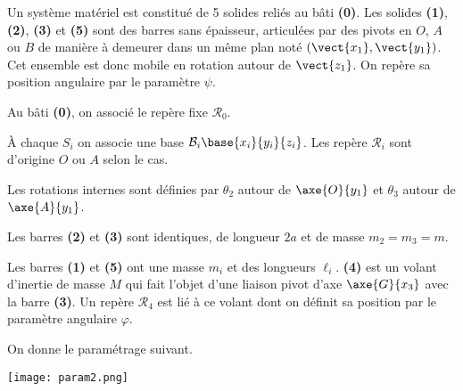 \ifprof
\else
\begin{multicols}{2}
\fi


Un système matériel est constitué de 5 solides reliés au bâti \textbf{(0)}. Les solides \textbf{(1)}, \textbf{(2)}, \textbf{(3)} et \textbf{(5)} sont des barres sans épaisseur, articulées par des pivots en $O$, $A$ ou $B$ de manière à demeurer dans un même plan noté $ \left(\vect{x_1},\vect{y_1}\right)$. Cet ensemble est donc mobile en rotation autour de $\vect{z_1}$. On repère sa position angulaire par le paramètre $\psi$. 

Au bâti \textbf{(0)}, on associé le repère fixe $\mathcal{R}_0$. 

À chaque $S_i$ on associe une base $\mathcal{B}_i\base{x_i}{y_i}{z_i}$. Les repère $\mathcal{R}_i$ sont d'origine $O$ ou $A$ selon le cas. 

Les rotations internes sont définies par $\theta_2$ autour de $\axe{O}{y_1}$ et $\theta_3$ autour de $\axe{A}{y_1}$.

Les barres \textbf{(2)} et \textbf{(3)} sont identiques, de longueur $2a$ et de masse $m_2=m_3=m$.

Les barres \textbf{(1)} et \textbf{(5)} ont une masse $m_i$ et des longueurs $\ell_i$. \textbf{(4)} est un volant d'inertie de masse $M$ qui fait l'objet d'une liaison pivot d'axe $\axe{G}{x_3}$ avec la barre \textbf{(3)}. Un repère $\mathcal{R}_4$ est lié à ce volant dont on définit sa position par le paramètre angulaire $\varphi$.

On donne le paramétrage suivant. 

\begin{center}
\texttt{[image: param2.png]}
\end{center}
%
%









\end{multicols}
